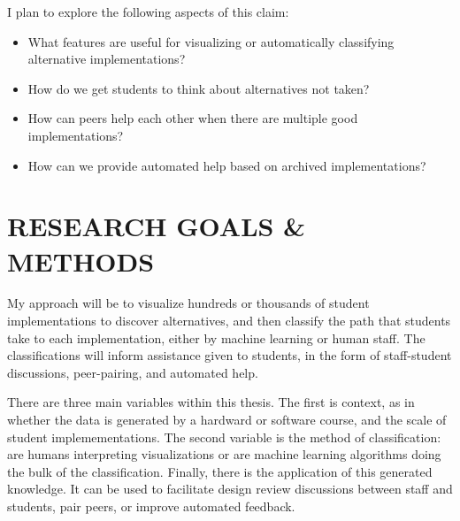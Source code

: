 \documentclass[12pt]{article}
\begin{document}
I plan to explore the following aspects of this claim:
\begin{itemize}

\item What features are useful for visualizing or automatically classifying alternative implementations?

\item How do we get students to think about alternatives not taken?

\item How can peers help each other when there are multiple good implementations?

\item How can we provide automated help based on archived implementations?

\end{itemize}


\section{RESEARCH GOALS \& METHODS}

My approach will be to visualize hundreds or thousands of student implementations to discover alternatives, and then classify the path that students take to each implementation, either by machine learning or human staff. The classifications will inform assistance given to students, in the form of staff-student discussions, peer-pairing, and automated help. 

There are three main variables within this thesis. The first is context, as in whether the data is generated by a hardward or software course, and the scale of student implemementations. The second variable is the method of classification: are humans interpreting visualizations or are machine learning algorithms doing the bulk of the classification. Finally, there is the application of this generated knowledge. It can be used to facilitate design review discussions between staff and students, pair peers, or improve automated feedback.
\end{document}
